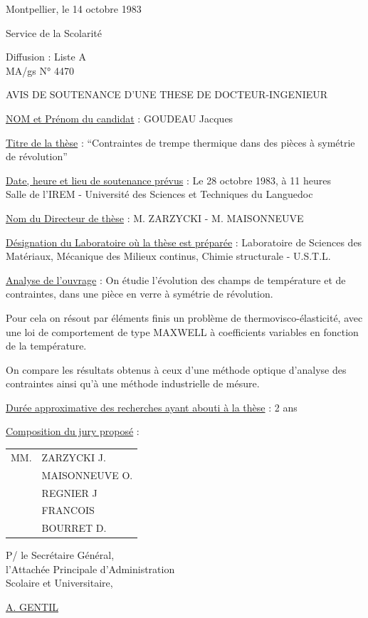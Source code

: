 Montpellier, le 14 octobre 1983

Service de la Scolarité

Diffusion : Liste A\\
MA/gs \hfill N° 4470

\begin{center}
AVIS DE SOUTENANCE D'UNE THESE DE DOCTEUR-INGENIEUR

\end{center}

\uline{NOM et Prénom du candidat} : GOUDEAU Jacques

\uline{Titre de la thèse} : ``Contraintes de trempe thermique dans des pièces à symétrie de révolution''

\uline{Date, heure et lieu de soutenance prévus} : Le 28 octobre 1983, à 11 heures\\
Salle de l'IREM - Université des Sciences et Techniques du Languedoc

\uline{Nom du Directeur de thèse} : M. ZARZYCKI - M. MAISONNEUVE

\uline{Désignation du Laboratoire où la thèse est préparée} : Laboratoire de Sciences des Matériaux, Mécanique des Milieux continus, Chimie structurale - U.S.T.L.

\uline{Analyse de l'ouvrage} : On étudie l'évolution des champs de température et de contraintes, dans une pièce en verre à symétrie de révolution.

Pour cela on résout par éléments finis un problème de thermovisco-élasticité, avec une loi de comportement de type MAXWELL à coefficients variables en fonction de la température.

On compare les résultats obtenus à ceux d'une méthode optique d'analyse des contraintes ainsi qu'à une méthode industrielle de mésure.

\uline{Durée approximative des recherches ayant abouti à la thèse} : 2 ans

\uline{Composition du jury proposé} : \begin{tabular}[t]{ll}
MM. & ZARZYCKI J.\\
& MAISONNEUVE O.\\
& REGNIER J\\
& FRANCOIS\\
& BOURRET D.
\end{tabular}

\begin{flushright}
P/ le Secrétaire Général,\\
l'Attachée Principale d'Administration\\
Scolaire et Universitaire,


\uline{A. GENTIL}
\end{flushright}


